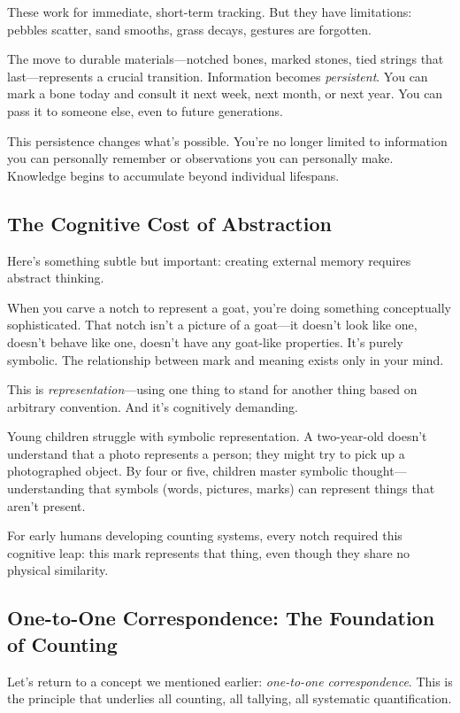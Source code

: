 These work for immediate, short-term tracking. But they have limitations: pebbles scatter, sand smooths, grass decays, gestures are forgotten.

The move to durable materials—notched bones, marked stones, tied strings that last—represents a crucial transition. Information becomes \textit{persistent}. You can mark a bone today and consult it next week, next month, or next year. You can pass it to someone else, even to future generations.

This persistence changes what's possible. You're no longer limited to information you can personally remember or observations you can personally make. Knowledge begins to accumulate beyond individual lifespans.

\subsection{The Cognitive Cost of Abstraction}

Here's something subtle but important: creating external memory requires abstract thinking.

When you carve a notch to represent a goat, you're doing something conceptually sophisticated. That notch isn't a picture of a goat—it doesn't look like one, doesn't behave like one, doesn't have any goat-like properties. It's purely symbolic. The relationship between mark and meaning exists only in your mind.

This is \textit{representation}—using one thing to stand for another thing based on arbitrary convention. And it's cognitively demanding.

Young children struggle with symbolic representation. A two-year-old doesn't understand that a photo represents a person; they might try to pick up a photographed object. By four or five, children master symbolic thought—understanding that symbols (words, pictures, marks) can represent things that aren't present.

For early humans developing counting systems, every notch required this cognitive leap: this mark represents that thing, even though they share no physical similarity.

\subsection{One-to-One Correspondence: The Foundation of Counting}

Let's return to a concept we mentioned earlier: \textit{one-to-one correspondence}. This is the principle that underlies all counting, all tallying, all systematic quantification.

